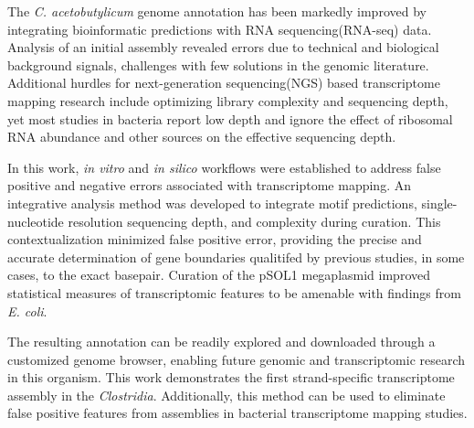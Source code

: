 

The {\it C. acetobutylicum} genome annotation has been markedly improved by integrating bioinformatic predictions with RNA sequencing(RNA-seq) data. Analysis of an initial assembly revealed errors due to technical and biological background signals, challenges with few solutions in the genomic literature. Additional hurdles for next-generation sequencing(NGS) based transcriptome mapping research include optimizing library complexity and sequencing depth, yet most studies in bacteria report low depth and ignore the effect of ribosomal RNA abundance and other sources on the effective sequencing depth. 

In this work, \textit{in vitro} and \textit{in silico} workflows were established to address false positive and negative errors associated with transcriptome mapping. An integrative analysis method was developed to integrate motif predictions, single-nucleotide resolution sequencing depth, and complexity during curation. This contextualization minimized false positive error, providing the precise and accurate determination of gene boundaries qualitifed by previous studies, in some cases, to the exact basepair. Curation of the pSOL1 megaplasmid improved statistical measures of transcriptomic features to be amenable with findings from \textit{E. coli}. 

The resulting annotation can be readily explored and downloaded through a customized genome browser, enabling future genomic and transcriptomic research in this organism. This work demonstrates the first strand-specific transcriptome assembly in the \textit{Clostridia}. Additionally, this method can be used to eliminate false positive features from assemblies in bacterial transcriptome mapping studies. 
